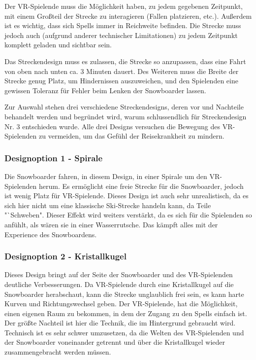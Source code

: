 Der VR-Spielende muss die Möglichkeit haben, zu jedem gegebenen Zeitpunkt, mit einem Großteil der Strecke zu interagieren (Fallen platzieren, etc.). Außerdem ist es wichtig, dass sich Spells immer in Reichweite befinden. Die Strecke muss jedoch auch (aufgrund anderer technischer Limitationen) zu jedem Zeitpunkt komplett geladen und sichtbar sein.

Das Streckendesign muss es zulassen, die Strecke so anzupassen, dass eine Fahrt von oben nach unten ca. 3 Minuten dauert. Des Weiteren muss die Breite der Strecke genug Platz, um Hindernissen auszuweichen, und den Spielenden eine gewissen Toleranz für Fehler beim Lenken der Snowboarder lassen.

Zur Auswahl stehen drei verschiedene Streckendesigns, deren vor und Nachteile behandelt werden und begründet wird, warum schlussendlich für Streckendesign Nr. 3 entschieden wurde. Alle drei Designs versuchen die Bewegung des VR-Spielenden zu vermeiden, um das Gefühl der Reisekrankheit zu mindern.

\subsubsection{Designoption 1 - Spirale}

Die Snowboarder fahren, in diesem Design, in einer Spirale um den VR-Spielenden herum. Es ermöglicht eine freie Strecke für die Snowboarder, jedoch ist wenig Platz für VR-Spielende. Dieses Design ist auch sehr unrealistisch, da es sich hier nicht um eine klassische Ski-Strecke handeln kann, da Teile "`Schweben". Dieser Effekt wird weiters verstärkt, da es sich für die Spielenden so anfühlt, als wären sie in einer Wasserrutsche. Das kämpft alles mit der Experience des Snowboardens.

\subsubsection{Designoption 2 - Kristallkugel}

Dieses Design bringt auf der Seite der Snowboarder und des VR-Spielenden deutliche Verbesserungen. Da VR-Spielende durch eine Kristallkugel auf die Snowboarder herabschaut, kann die Strecke unglaublich frei sein, es kann harte Kurven und Richtungswechsel geben. Der VR-Spielende, hat die Möglichkeit, einen eigenen Raum zu bekommen, in dem der Zugang zu den Spells einfach ist. Der größte Nachteil ist hier die Technik, die im Hintergrund gebraucht wird. Technisch ist es sehr schwer umzusetzen, da die Welten des VR-Spielenden und der Snowboarder voneinander getrennt und über die Kristallkugel wieder zusammengebracht werden müssen.

